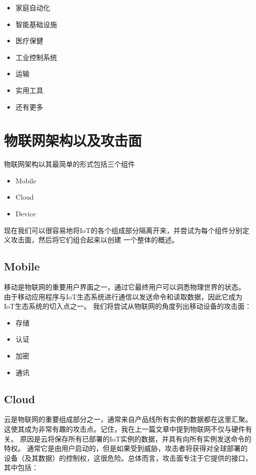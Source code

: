 \documentclass[onecolumn,oneside]{BUPTHomework}
\begin{document}
  \begin{itemize}
    \item 家庭自动化
    \item 智能基础设施
    \item 医疗保健
    \item 工业控制系统
    \item 运输
    \item 实用工具
    \item 还有更多
  \end{itemize}

  
  \section{物联网架构以及攻击面}

  物联网架构以其最简单的形式包括三个组件\cite{seebug.org}

  \begin{itemize}
    \item Mobile
    \item Cloud
    \item Device
  \end{itemize}

  现在我们可以很容易地将IoT的各个组成部分隔离开来，并尝试为每个组件分别定义攻击面，然后将它们组合起来以创建 一个整体的概述。

  \subsection{Mobile}

  移动是物联网的重要用户界面之一，通过它最终用户可以洞悉物理世界的状态。
  由于移动应用程序与IoT生态系统进行通信以发送命令和读取数据，因此它成为IoT生态系统的切入点之一。
  我们将尝试从物联网的角度列出移动设备的攻击面：

  \begin{itemize}
    \item 存储
    \item 认证
    \item 加密
    \item 通讯
  \end{itemize}

  \subsection{Cloud} 

  云是物联网的重要组成部分之一，通常来自产品线所有实例的数据都在这里汇聚。
  这使其成为非常有趣的攻击点。记住，我在上一篇文章中提到物联网不仅与硬件有关。
  原因是云将保存所有已部署的IoT实例的数据，并具有向所有实例发送命令的特权。
  通常它是由用户启动的，但是如果受到威胁，攻击者将获得对全球部署的设备（及其数据）的控制权，这很危险。总体而言，攻击面专注于它提供的接口，其中包括：
\end{document}
